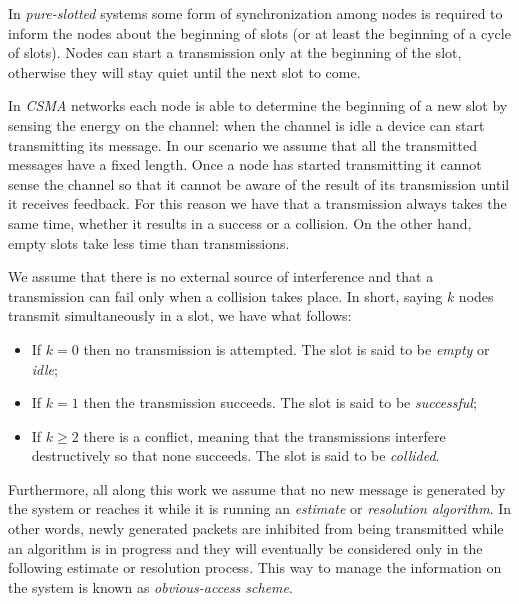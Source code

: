 \documentclass[12pt,a4paper]{report}
\newcommand{\rev}[1]{\textcolor{Cerulean}{#1}}
\begin{document}
\rev{
In \emph{pure-slotted} systems some form of synchronization among nodes is required to inform the nodes about the beginning of slots (or at least the beginning of a cycle of slots). Nodes can start a transmission only at the beginning of the slot, otherwise they will stay quiet until the next slot to come.\\}

\rev{
In \emph{CSMA} networks each node is able to determine the beginning of a new slot by sensing the energy on the channel: when the channel is idle a device can start transmitting its message. In our scenario we assume that all the transmitted messages have a fixed length. Once a node has started transmitting it cannot sense the channel so that it cannot be aware of the result of its transmission until it receives feedback. For this reason we have that a transmission always takes the same time, whether it results in a success or a collision. On the other hand, empty slots take less time than transmissions.\\}

We assume that there is no external source of interference and that a transmission can fail only when a collision takes place.
In short, saying $k$ nodes transmit simultaneously in a slot, we have what follows:
\begin{itemize}
\item If $k=0$ then no transmission is attempted. The slot is said to be \emph{empty} or \emph{idle};
\item If $k=1$ then the transmission succeeds. The slot is said to be \emph{successful};
\item If $k\geq 2$ there is a conflict, meaning that the transmissions interfere destructively so that none succeeds. The slot is said to be \emph{collided}.\\
\end{itemize}

\rev{
Furthermore, all along this work we assume that no new message is generated by the system or reaches it while it is running an \emph{estimate} or \emph{resolution algorithm}. In other words, newly generated packets are inhibited from being transmitted while an algorithm is in progress and they will eventually be considered only in the following estimate or resolution process. This way to manage the information on the system is known as \emph{obvious-access scheme}.\\}
\end{document}
